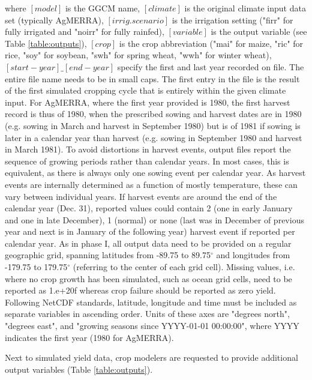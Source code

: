 \documentclass[gmd, manuscript]{copernicus} %
\begin{document}
\noindent where $[model]$ is the GGCM name, $[climate]$ is the original climate input data set (typically AgMERRA), $[irrig.scenario]$ is the irrigation setting ("firr" for fully irrigated and "noirr" for fully rainfed), $[variable]$ is the output variable (see Table \ref{table:outputs}), $[crop]$ is the crop abbreviation ("mai" for maize, "ric" for rice, "soy" for soybean, "swh" for spring wheat, "wwh" for winter wheat), $[start-year]\_[end-year]$ specify the first and last year recorded on file. 
The entire file name needs to be in small caps. 
The first entry in the file is the result of the first simulated cropping cycle that is entirely within the given climate input. 
For AgMERRA, where the first year provided is 1980, the first harvest record is thus of 1980, when the prescribed sowing and harvest dates are in 1980 (e.g. sowing in March and harvest in September 1980) but is of 1981 if sowing is later in a calendar year than harvest (e.g. sowing in September 1980 and harvest in March 1981). 
To avoid distortions in harvest events, output files report the sequence of growing periods rather than calendar years. 
In most cases, this is equivalent, as there is always only one sowing event per calendar year.
As harvest events are internally determined as a function of mostly temperature, these can vary between individual years. 
If harvest events are around the end of the calendar year (Dec. 31), reported values could contain 2 (one in early January and one in late December), 1 (normal) or none (last was in December of previous year and next is in January of the following year) harvest event if reported per calendar year.
As in phase I, all output data need to be provided on a regular geographic grid, spanning latitudes from -89.75 to 89.75$^{\circ}$ and longitudes from -179.75 to 179.75$^{\circ}$ (referring to the center of each grid cell). 
Missing values, i.e. where no crop growth has been simulated, such as ocean grid cells, need to be reported as 1.e+20f whereas crop failure should be reported as zero yield. 
Following NetCDF standards, latitude, longitude and time must be included as separate variables in ascending order.
Units of these axes are "degrees north", "degrees east", and "growing seasons since YYYY-01-01 00:00:00", where YYYY indicates the first year (1980 for AgMERRA).

Next to simulated yield data, crop modelers are requested to provide additional output variables (Table \ref{table:outputs}). 
\end{document}
